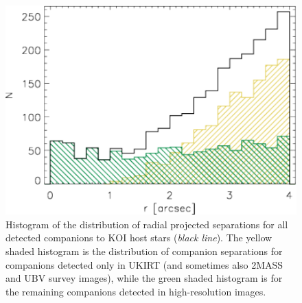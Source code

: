 \documentclass[twocolumn,appendixfloats]{aastex6}
\begin{document}
\begin{figure}[!]
\centering
\includegraphics[scale=0.5]{KOI_dist_histo.pdf}
\caption{Histogram of the distribution of radial projected separations for all detected
companions to KOI host stars ({\it black line}). The yellow shaded histogram 
is the distribution of companion separations for companions detected only in
UKIRT (and sometimes also 2MASS and UBV survey images), while the 
green shaded histogram is for the remaining companions detected in 
high-resolution images.
\label{KOI_dist_histo}}
\end{figure}
\end{document}
